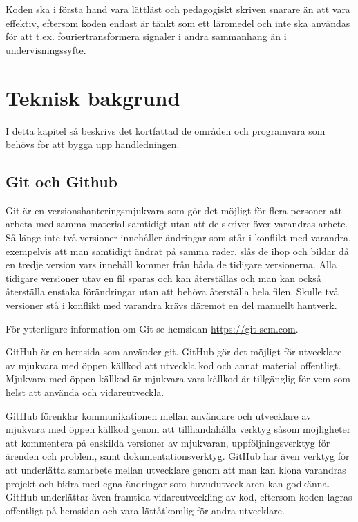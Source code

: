 \documentclass[]{article}
\begin{document}
Koden ska i första hand vara lättläst och pedagogiskt skriven snarare än att vara effektiv, eftersom koden endast är 
tänkt som ett läromedel och inte ska användas för att t.ex. fouriertransformera signaler i andra sammanhang än i 
undervisningssyfte.  


\section{Teknisk bakgrund}
I detta kapitel så beskrivs det kortfattad de områden och programvara som
behövs för att bygga upp handledningen.

\subsection{Git och Github}
Git är en versionshanteringsmjukvara som gör det möjligt för flera personer att arbeta med samma material samtidigt utan 
att de skriver över varandras arbete. Så länge inte två versioner innehåller ändringar som står i konflikt med varandra, 
exempelvis att man samtidigt ändrat på samma rader, slås de ihop och bildar då en tredje version vars innehåll kommer 
från båda de tidigare versionerna. Alla tidigare versioner utav en fil sparas och kan återställas och man kan också 
återställa enstaka förändringar utan att behöva återställa hela filen. Skulle två versioner stå i konflikt med varandra 
krävs däremot en del manuellt hantverk.

För ytterligare information om Git se hemsidan \url{https://git-scm.com}.

GitHub är en hemsida som använder git. GitHub gör det möjligt för utvecklare av mjukvara med öppen källkod att utveckla 
kod och annat material offentligt. Mjukvara med öppen källkod är mjukvara vars källkod är tillgänglig för vem som helst 
att använda och vidareutveckla.

GitHub förenklar kommunikationen mellan användare och utvecklare av mjukvara med öppen källkod genom att tillhandahålla 
verktyg såsom möjligheter att kommentera på enskilda versioner av mjukvaran, uppföljningsverktyg för ärenden och problem, 
samt dokumentationsverktyg. GitHub har även verktyg för att underlätta samarbete mellan utvecklare genom att man kan 
klona varandras projekt och bidra med egna ändringar som huvudutvecklaren kan godkänna. GitHub underlättar även framtida 
vidareutveckling av kod, eftersom koden lagras offentligt på hemsidan och vara lättåtkomlig för andra utvecklare. 
\end{document}
